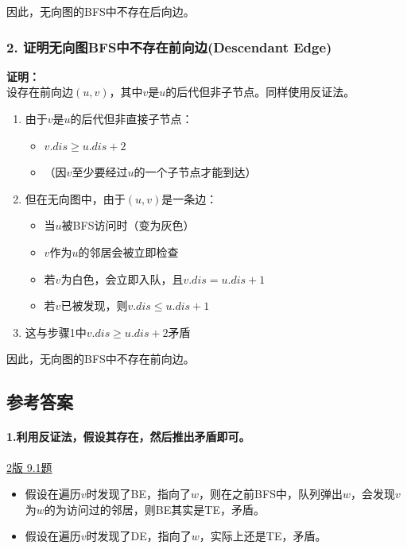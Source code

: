 \documentclass{article}
\begin{document}
\noindent 因此，无向图的BFS中不存在后向边。

\subsubsection{2. 证明无向图BFS中不存在前向边(Descendant Edge)}

\noindent\textbf{证明：}\\
设存在前向边$(u,v)$，其中$v$是$u$的后代但非子节点。同样使用反证法。

\begin{enumerate}
    \item 由于$v$是$u$的后代但非直接子节点：
    \begin{itemize}
        \item $v.dis \geq u.dis + 2$
        \item （因$v$至少要经过$u$的一个子节点才能到达）
    \end{itemize}
    
    \item 但在无向图中，由于$(u,v)$是一条边：
    \begin{itemize}
        \item 当$u$被BFS访问时（变为灰色）
        \item $v$作为$u$的邻居会被立即检查
        \item 若$v$为白色，会立即入队，且$v.dis = u.dis + 1$
        \item 若$v$已被发现，则$v.dis \leq u.dis + 1$
    \end{itemize}
    
    \item 这与步骤1中$v.dis \geq u.dis + 2$矛盾
\end{enumerate}

\noindent 因此，无向图的BFS中不存在前向边。
\subsection{参考答案}


\paragraph{1.利用反证法，假设其存在，然后推出矛盾即可。}

\href{https://github.com/Shannju/njucser_helphelp/blob/main/Algorithm%E7%AE%97%E6%B3%95/%E7%AD%94%E6%A1%88/P4~7.pdf}{2版 9.1题}

\begin{itemize}
    \item 假设在遍历$v$时发现了BE，指向了$w$，则在之前BFS中，队列弹出$w$，会发现$v$为$w$的为访问过的邻居，则BE其实是TE，矛盾。
    \item 假设在遍历$v$时发现了DE，指向了$w$，实际上还是TE，矛盾。
\end{itemize}
\end{document}

